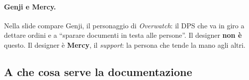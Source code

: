\paragraph{Genji e Mercy.} Nella slide compare Genji, il personaggio di
\emph{Overwatch}: il DPS che va in giro a dettare ordini e a ``sparare
documenti in testa alle persone''. Il designer \textbf{non è} questo. Il
designer è \textbf{Mercy}, il \emph{support}: la persona che tende la mano agli
altri.

\subsection{A che cosa serve la documentazione}



